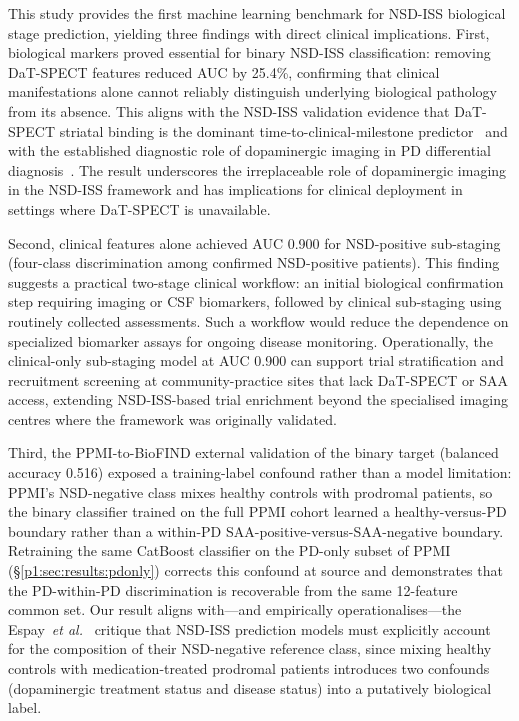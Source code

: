 This study provides the first machine learning benchmark for NSD-ISS biological stage prediction, yielding three findings with direct clinical implications. First, biological markers proved essential for binary NSD-ISS classification: removing DaT-SPECT features reduced AUC by 25.4\%, confirming that clinical manifestations alone cannot reliably distinguish underlying biological pathology from its absence. This aligns with the NSD-ISS validation evidence that DaT-SPECT striatal binding is the dominant time-to-clinical-milestone predictor~\cite{simuni2024val} and with the established diagnostic role of dopaminergic imaging in PD differential diagnosis~\cite{seibyl2018dat}. The result underscores the irreplaceable role of dopaminergic imaging in the NSD-ISS framework and has implications for clinical deployment in settings where DaT-SPECT is unavailable.

Second, clinical features alone achieved AUC 0.900 for NSD-positive sub-staging (four-class discrimination among confirmed NSD-positive patients). This finding suggests a practical two-stage clinical workflow: an initial biological confirmation step requiring imaging or CSF biomarkers, followed by clinical sub-staging using routinely collected assessments. Such a workflow would reduce the dependence on specialized biomarker assays for ongoing disease monitoring. Operationally, the clinical-only sub-staging model at AUC 0.900 can support trial stratification and recruitment screening at community-practice sites that lack DaT-SPECT or SAA access, extending NSD-ISS-based trial enrichment beyond the specialised imaging centres where the framework was originally validated.

Third, the PPMI-to-BioFIND external validation of the binary target (balanced accuracy 0.516) exposed a training-label confound rather than a model limitation: PPMI's NSD-negative class mixes healthy controls with prodromal patients, so the binary classifier trained on the full PPMI cohort learned a healthy-versus-PD boundary rather than a within-PD SAA-positive-versus-SAA-negative boundary. Retraining the same CatBoost classifier on the PD-only subset of PPMI (\S\ref{p1:sec:results:pdonly}) corrects this confound at source and demonstrates that the PD-within-PD discrimination is recoverable from the same 12-feature common set. Our result aligns with---and empirically operationalises---the Espay~\textit{et al.}~\cite{espay2025med} critique that NSD-ISS prediction models must explicitly account for the composition of their NSD-negative reference class, since mixing healthy controls with medication-treated prodromal patients introduces two confounds (dopaminergic treatment status and disease status) into a putatively biological label.

